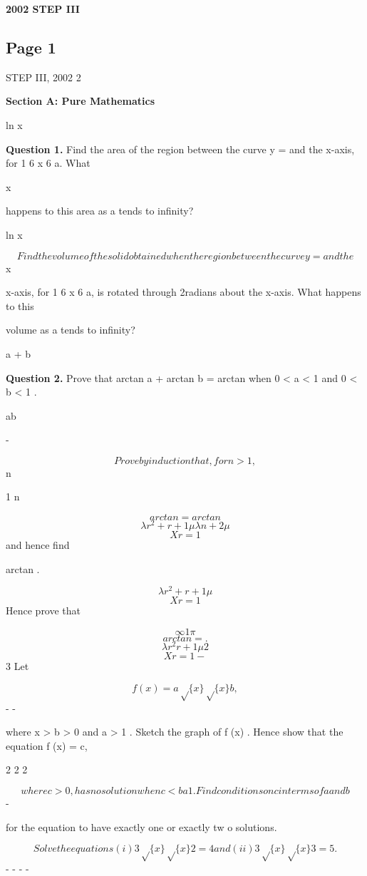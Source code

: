 \documentclass[12pt]{article}
\begin{document}
\begin{center}
{\Large \textbf{2002 STEP III}}
\end{center}

\subsection*{Page 1}
\begin{flushleft}
STEP III, 2002 2\par
\bigskip\textbf{Section A: Pure Mathematics}\par
ln x\par
\bigskip\textbf{Question 1.} Find the area of the region between the curve y = and the x-axis, for 1 6 x 6 a. What\par
x\par
happens to this area as a tends to infinity?\par
ln x\par
\[Find the volume of the solid obtained when the region between the curve y = and the\]
x\par
x-axis, for 1 6 x 6 a, is rotated through 2\pi radians about the x-axis. What happens to this\par
volume as a tends to infinity?\par
a + b\par
\bigskip\textbf{Question 2.} Prove that arctan a + arctan b = arctan when 0 < a < 1 and 0 < b < 1 .\par
{} ab \mu\par
-\par
\[Prove by induction that, for n > 1 ,\]
n\par
1 n\par
\[arctan = arctan\]
\[\lambda r^2 + r + 1 \mu \lambda n + 2 \mu\]
\[Xr=1\]
and hence find\par
{}\par
arctan .\par
\[\lambda r^2 + r + 1 \mu\]
\[Xr=1\]
Hence prove that\par
\[\infty 1 \pi\]
\[arctan = .\]
\[\lambda r^2 r + 1 \mu 2\]
\[Xr=1 -\]
3 Let\par
\[f (x) = a\sqrt\{x\} \sqrt\{x\} b ,\]
- -\par
where x > b > 0 and a > 1 . Sketch the graph of f (x) . Hence show that the equation f (x) = c,\par
2 2 2\par
\[where c > 0, has no solution when c < b a 1 . Find conditions on c in terms of a and b\]
-\par
for the equation to have exactly one or exactly tw o solutions.\par
\[Solve the equations (i) 3\sqrt\{x\} \sqrt\{x\} 2 = 4 and (ii) 3\sqrt\{x\} \sqrt\{x\} 3 = 5 .\]
- - - -\par
\end{flushleft}
\end{document}

